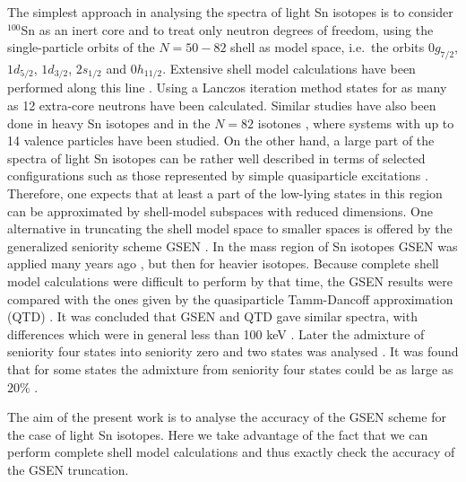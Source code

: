 The simplest approach in analysing the spectra of light Sn isotopes is
to consider $^{100}$Sn as an inert core and to treat only  neutron degrees
of freedom, using the single-particle orbits
of the $N=50-82$ shell as model space, i.e.\ the orbits
$0g_{7/2}$, $1d_{5/2}$, $1d_{3/2}$, $2s_{1/2}$ and
$0h_{11/2}$. Extensive shell model
calculations have been performed along this line \cite{oslo95a}. 
Using a 
Lanczos iteration method states for as many as 12  
extra-core neutrons have been calculated. 
Similar studies have also been done in heavy Sn isotopes \cite{oslo95c}
and in the $N=82$ isotones \cite{oslo96d}, where systems with up to 
14 valence particles have been studied.
On the other hand, a large part of the spectra of light Sn
isotopes can be rather well  described in terms of selected 
configurations such as 
those represented by simple 
quasiparticle excitations  \cite{Stockholm95}.
Therefore, one expects that at least  a part of the low-lying states 
in this region can be approximated by shell-model subspaces with 
reduced dimensions.
One  alternative in truncating the shell model space to 
smaller spaces is offered by 
the generalized seniority scheme GSEN \cite{Talmi71}.
In the mass region of Sn isotopes  GSEN was
applied many years ago \cite{Ottaviani69,Gambhir71}, but then for  
heavier isotopes.
Because complete  shell model calculations were difficult to perform by
that time,  the GSEN results were compared with the ones given by the 
quasiparticle 
Tamm-Dancoff  approximation (QTD) \cite{Gambhir71}. 
It was concluded  that  GSEN and QTD gave similar spectra,
with differences which were  in general less than 100 keV  \cite{Gambhir71}.
Later the admixture of seniority four
states into seniority zero and two states
was analysed \cite{Bonsignori85,Allaart88}. It was  found that 
for some states  the  admixture from seniority four states
could be as large as  $20\%$ .

The aim of the present work is to analyse the accuracy of  the GSEN scheme
for the case of light Sn isotopes. Here we take  advantage of  the fact 
that we can perform complete  shell model 
calculations \cite{oslo95a} 
and thus  exactly check the accuracy of the GSEN 
truncation.
 

